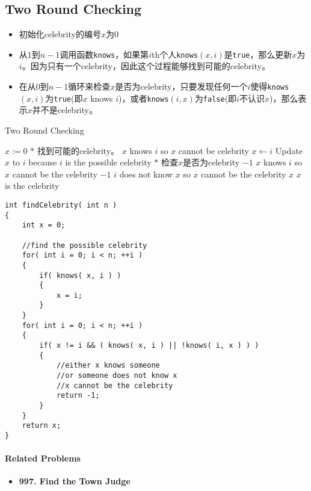 \subsection{Two Round Checking}
\begin{itemize}
\item 初始化celebrity的编号$x$为0
\item 从$1$到$n-1$调用函数\texttt{knows}，如果第$i$th个人\texttt{knows}$(x,i)$是\texttt{true}，那么更新$x$为$i$。因为只有一个celebrity，因此这个过程能够找到可能的celebrity。
\item 在从$0$到$n-1$循环来检查$x$是否为celebrity，只要发现任何一个$i$使得\texttt{knows}$(x,i)$为\texttt{true}(即$x$ knows $i$)，或者\texttt{knows}$(i,x)$为\texttt{false}(即$i$不认识$x$)，那么表示$x$并不是celebrity。
\end{itemize}
\setcounter{algorithm}{0}
\begin{algorithm}[H]
\caption{Two Round Checking}
\begin{algorithmic}[1]
\State $x:=0$
\State $\ast$ 找到可能的celebrity。
 \Comment $x$ knows $i$ so $x$ cannot be celebrity
\State $x\gets i$ \Comment Update $x$ to $i$ because $i$ is the possible celebrity
\EndIf
\EndFor
\State $\ast$ 检查$x$是否为celebrity
\State \Return $-1$ \Comment $x$ knows $i$ so $x$ cannot be the celebrity
\EndIf
{}
\State \Return $-1$ \Comment $i$ does not know $x$ so $x$ cannot be the celebrity
\EndIf
\EndIf
\EndFor
\State \Return $x$ \Comment $x$ is the celebrity
\EndProcedure
\end{algorithmic}
\end{algorithm}
\setcounter{lstlisting}{0}
\begin{lstlisting}[style=customc, caption={Two Round Checking}]
int findCelebrity( int n )
{
    int x = 0;

    //find the possible celebrity
    for( int i = 0; i < n; ++i )
    {
        if( knows( x, i ) )
        {
            x = i;
        }
    }
    for( int i = 0; i < n; ++i )
    {
        if( x != i && ( knows( x, i ) || !knows( i, x ) ) )
        {
            //either x knows someone
            //or someone does not know x
            //x cannot be the celebrity
            return -1;
        }
    }
    return x;
}
\end{lstlisting}

\paragraph{Related Problems }
\begin{itemize}
\item \textbf{997. Find the Town Judge}
\end{itemize}